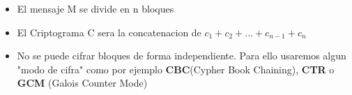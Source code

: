 \documentclass{article}
\begin{document}
\begin{itemize}
    \item El mensaje M se divide en n bloques
    \item El Criptograma C sera la concatenacion de $c_{1} + c_{2} + ... + c_{n-1} + c_{n}$
    \item No se puede cifrar bloques de forma independiente. Para ello usaremos algun "modo de cifra"
        como por ejemplo \textbf{CBC}(Cypher Book Chaining), \textbf{CTR} o \textbf{GCM} (Galois
        Counter Mode)
\end{itemize}
\end{document}
